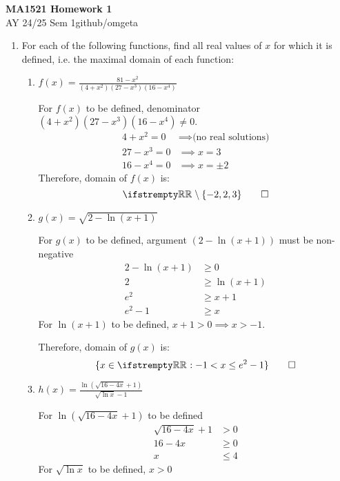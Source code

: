 \documentclass[12pt, a4paper]{article}
\newcommand{\mytitle}{MA1521 Homework 1}
\newcommand{\myauthor}{github/omgeta}
\newcommand{\mydate}{AY 24/25 Sem 1}
\begin{document}
\raggedright
\footnotesize
\begin{center}
{\normalsize{\textbf{\mytitle}}} \\
{\footnotesize{\mydate\hspace{2pt}\textemdash\hspace{2pt}\myauthor}}
\end{center}

\begin{enumerate}[Q\arabic*.]
  \item For each of the following functions, find all real values of $x$ for which it is defined, i.e.
the maximal domain of each function:
  \begin{enumerate}[(\alph*)]
    \item $\displaystyle f(x) = \frac{81 - x^2}{(4+x^2)(27-x^3)(16-x^4)}$

      For $f(x)$ to be defined, denominator $(4+x^2)(27-x^3)(16-x^4) \neq 0$.
    \begin{align*}
      4 + x^2 = 0 &\implies \text{(no real solutions)} \\
      27 - x^3 = 0 &\implies x = 3 \\
      16 - x^4 = 0 &\implies x = \pm 2
    \end{align*}
    Therefore, domain of \( f(x) \) is:
    \[
    \RR \setminus \{-2, 2, 3\} \qed
    \]
  \item $g(x) = \sqrt{2 - \ln(x+1)}$

    For $g(x)$ to be defined, argument $(2 - \ln(x+1))$ must be non-negative
    \begin{align*}
      2 - \ln(x+1) &\geq 0 \\
      2 &\geq \ln(x+1) \\
      e^2 &\geq x + 1 \\
      e^2 - 1 &\geq x
    \end{align*}
    For $\ln(x+1)$ to be defined, $x + 1 > 0 \implies x > -1 $. 
    
    Therefore, domain of $g(x)$ is:
    \[
      \{x \in \RR : -1 < x \leq e^2 - 1\} \qed
    \]

  \item $\displaystyle h(x) = \frac{\ln(\sqrt{16-4x}+1)}{\sqrt{\ln x}-1}$

      For $\ln(\sqrt{16-4x}+1)$ to be defined
        \begin{align*}
          \sqrt{16-4x} + 1 &> 0 \\
          16 - 4x &\geq 0 \\
          x &\leq 4
        \end{align*}
      For $\sqrt{\ln x}$ to be defined, $x > 0$


\end{enumerate}
\end{enumerate}
\end{document}
